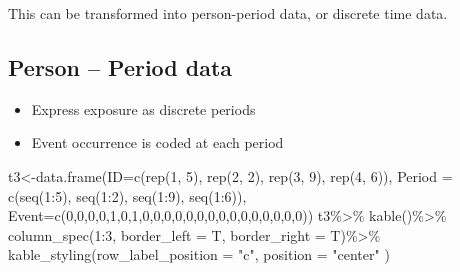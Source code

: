 \documentclass[
  letterpaper,
  DIV=11,
  numbers=noendperiod]{scrreprt}
\newenvironment{Shaded}{\begin{snugshade}}{\end{snugshade}}
\newcommand{\AttributeTok}[1]{\textcolor[rgb]{0.40,0.45,0.13}{#1}}
\newcommand{\DecValTok}[1]{\textcolor[rgb]{0.68,0.00,0.00}{#1}}
\newcommand{\FunctionTok}[1]{\textcolor[rgb]{0.28,0.35,0.67}{#1}}
\newcommand{\NormalTok}[1]{\textcolor[rgb]{0.00,0.23,0.31}{#1}}
\newcommand{\OtherTok}[1]{\textcolor[rgb]{0.00,0.23,0.31}{#1}}
\newcommand{\SpecialCharTok}[1]{\textcolor[rgb]{0.37,0.37,0.37}{#1}}
\newcommand{\StringTok}[1]{\textcolor[rgb]{0.13,0.47,0.30}{#1}}
\providecommand{\tightlist}{%
  \setlength{\itemsep}{0pt}\setlength{\parskip}{0pt}}\usepackage{longtable,booktabs,array}
\begin{document}
This can be transformed into person-period data, or discrete time data.

\hypertarget{person-period-data}{%
\subsection{Person -- Period data}\label{person-period-data}}

\begin{itemize}
\tightlist
\item
  Express exposure as discrete periods
\item
  Event occurrence is coded at each period
\end{itemize}

\begin{Shaded}
\begin{Highlighting}[]
\NormalTok{t3}\OtherTok{\textless{}{-}}\FunctionTok{data.frame}\NormalTok{(}\AttributeTok{ID=}\FunctionTok{c}\NormalTok{(}\FunctionTok{rep}\NormalTok{(}\DecValTok{1}\NormalTok{, }\DecValTok{5}\NormalTok{), }\FunctionTok{rep}\NormalTok{(}\DecValTok{2}\NormalTok{, }\DecValTok{2}\NormalTok{), }\FunctionTok{rep}\NormalTok{(}\DecValTok{3}\NormalTok{, }\DecValTok{9}\NormalTok{), }\FunctionTok{rep}\NormalTok{(}\DecValTok{4}\NormalTok{, }\DecValTok{6}\NormalTok{)),}
                    \AttributeTok{Period =} \FunctionTok{c}\NormalTok{(}\FunctionTok{seq}\NormalTok{(}\DecValTok{1}\SpecialCharTok{:}\DecValTok{5}\NormalTok{), }\FunctionTok{seq}\NormalTok{(}\DecValTok{1}\SpecialCharTok{:}\DecValTok{2}\NormalTok{), }\FunctionTok{seq}\NormalTok{(}\DecValTok{1}\SpecialCharTok{:}\DecValTok{9}\NormalTok{), }\FunctionTok{seq}\NormalTok{(}\DecValTok{1}\SpecialCharTok{:}\DecValTok{6}\NormalTok{)),}
                    \AttributeTok{Event=}\FunctionTok{c}\NormalTok{(}\DecValTok{0}\NormalTok{,}\DecValTok{0}\NormalTok{,}\DecValTok{0}\NormalTok{,}\DecValTok{0}\NormalTok{,}\DecValTok{1}\NormalTok{,}\DecValTok{0}\NormalTok{,}\DecValTok{1}\NormalTok{,}\DecValTok{0}\NormalTok{,}\DecValTok{0}\NormalTok{,}\DecValTok{0}\NormalTok{,}\DecValTok{0}\NormalTok{,}\DecValTok{0}\NormalTok{,}\DecValTok{0}\NormalTok{,}\DecValTok{0}\NormalTok{,}\DecValTok{0}\NormalTok{,}\DecValTok{0}\NormalTok{,}\DecValTok{0}\NormalTok{,}\DecValTok{0}\NormalTok{,}\DecValTok{0}\NormalTok{,}\DecValTok{0}\NormalTok{,}\DecValTok{0}\NormalTok{,}\DecValTok{0}\NormalTok{))}
\NormalTok{t3}\SpecialCharTok{\%\textgreater{}\%}
  \FunctionTok{kable}\NormalTok{()}\SpecialCharTok{\%\textgreater{}\%}
  \FunctionTok{column\_spec}\NormalTok{(}\DecValTok{1}\SpecialCharTok{:}\DecValTok{3}\NormalTok{, }\AttributeTok{border\_left =}\NormalTok{ T, }\AttributeTok{border\_right =}\NormalTok{ T)}\SpecialCharTok{\%\textgreater{}\%}
  \FunctionTok{kable\_styling}\NormalTok{(}\AttributeTok{row\_label\_position =} \StringTok{"c"}\NormalTok{, }\AttributeTok{position =} \StringTok{"center"}\NormalTok{ )}
\end{Highlighting}
\end{Shaded}
\end{document}

